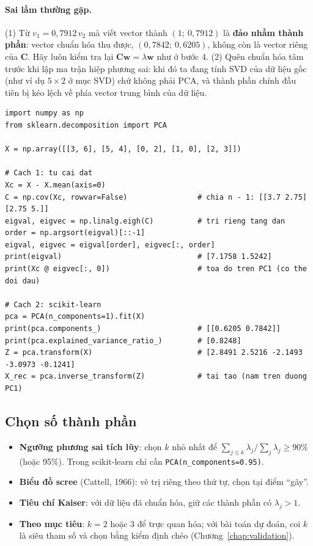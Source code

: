 \paragraph{Sai lầm thường gặp.} (1) Từ $v_1 = 0{,}7912\,v_2$ mà viết vector thành $(1;\ 0{,}7912)$ là \textbf{đảo nhầm thành phần}: vector chuẩn hóa thu được, $(0{,}7842;\ 0{,}6205)$, không còn là vector riêng của $\mathbf{C}$. Hãy luôn kiểm tra lại $\mathbf{C}\mathbf{w} = \lambda\mathbf{w}$ như ở bước 4. (2) Quên chuẩn hóa tâm trước khi lập ma trận hiệp phương sai: khi đó ta đang tính SVD của dữ liệu gốc (như ví dụ $5 \times 2$ ở mục SVD) chứ không phải PCA, và thành phần chính đầu tiên bị kéo lệch về phía vector trung bình của dữ liệu.

\begin{lstlisting}[caption={Kiểm tra ví dụ bằng NumPy và scikit-learn}]
import numpy as np
from sklearn.decomposition import PCA

X = np.array([[3, 6], [5, 4], [0, 2], [1, 0], [2, 3]])

# Cach 1: tu cai dat
Xc = X - X.mean(axis=0)
C = np.cov(Xc, rowvar=False)                # chia n - 1: [[3.7 2.75] [2.75 5.]]
eigval, eigvec = np.linalg.eigh(C)          # tri rieng tang dan
order = np.argsort(eigval)[::-1]
eigval, eigvec = eigval[order], eigvec[:, order]
print(eigval)                               # [7.1758 1.5242]
print(Xc @ eigvec[:, 0])                    # toa do tren PC1 (co the doi dau)

# Cach 2: scikit-learn
pca = PCA(n_components=1).fit(X)
print(pca.components_)                      # [[0.6205 0.7842]]
print(pca.explained_variance_ratio_)        # [0.8248]
Z = pca.transform(X)                        # [2.8491 2.5216 -2.1493 -3.0973 -0.1241]
X_rec = pca.inverse_transform(Z)            # tai tao (nam tren duong PC1)
\end{lstlisting}


\subsection{Chọn số thành phần}

\begin{itemize}
    \item \textbf{Ngưỡng phương sai tích lũy}: chọn $k$ nhỏ nhất để $\sum_{j \leq k}\lambda_j / \sum_j \lambda_j \geq 90\%$ (hoặc 95\%). Trong scikit-learn chỉ cần \texttt{PCA(n\_components=0.95)}.
    \item \textbf{Biểu đồ scree} (Cattell, 1966): vẽ trị riêng theo thứ tự, chọn tại điểm ``gãy''.
    \item \textbf{Tiêu chí Kaiser}: với dữ liệu đã chuẩn hóa, giữ các thành phần có $\lambda_j > 1$.
    \item \textbf{Theo mục tiêu}: $k = 2$ hoặc 3 để trực quan hóa; với bài toán dự đoán, coi $k$ là siêu tham số và chọn bằng kiểm định chéo (Chương~\ref{chap:validation}).
\end{itemize}

